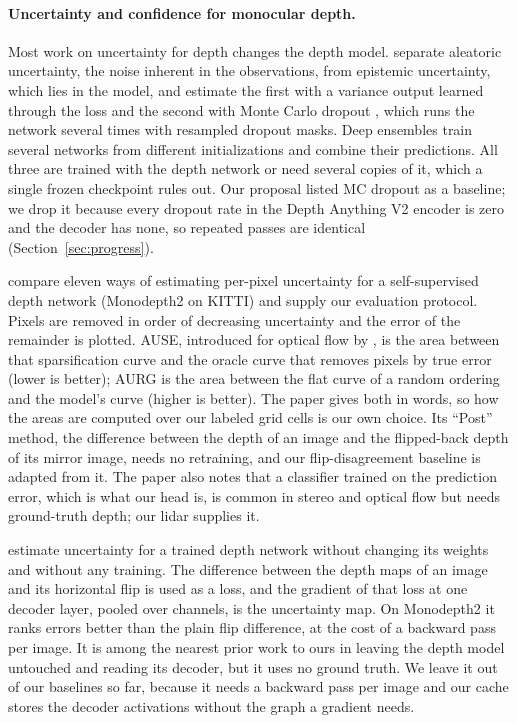 \paragraph{Uncertainty and confidence for monocular depth.}
Most work on uncertainty for depth changes the depth model. \citet{kendall2017uncertainties} separate aleatoric uncertainty, the noise inherent in the observations, from epistemic uncertainty, which lies in the model, and estimate the first with a variance output learned through the loss and the second with Monte Carlo dropout \citep{gal2016dropout}, which runs the network several times with resampled dropout masks. Deep ensembles \citep{lakshminarayanan2017ensembles} train several networks from different initializations and combine their predictions. All three are trained with the depth network or need several copies of it, which a single frozen checkpoint rules out. Our proposal listed MC dropout as a baseline; we drop it because every dropout rate in the Depth Anything V2 encoder is zero and the decoder has none, so repeated passes are identical (Section~\ref{sec:progress}).

\citet{poggi2020uncertainty} compare eleven ways of estimating per-pixel uncertainty for a self-supervised depth network (Monodepth2 on KITTI) and supply our evaluation protocol. Pixels are removed in order of decreasing uncertainty and the error of the remainder is plotted. AUSE, introduced for optical flow by \citet{ilg2018uncertainty}, is the area between that sparsification curve and the oracle curve that removes pixels by true error (lower is better); AURG is the area between the flat curve of a random ordering and the model's curve (higher is better). The paper gives both in words, so how the areas are computed over our labeled grid cells is our own choice. Its ``Post'' method, the difference between the depth of an image and the flipped-back depth of its mirror image, needs no retraining, and our flip-disagreement baseline is adapted from it. The paper also notes that a classifier trained on the prediction error, which is what our head is, is common in stereo and optical flow but needs ground-truth depth; our lidar supplies it.

\citet{hornauer2022gradient} estimate uncertainty for a trained depth network without changing its weights and without any training. The difference between the depth maps of an image and its horizontal flip is used as a loss, and the gradient of that loss at one decoder layer, pooled over channels, is the uncertainty map. On Monodepth2 it ranks errors better than the plain flip difference, at the cost of a backward pass per image. It is among the nearest prior work to ours in leaving the depth model untouched and reading its decoder, but it uses no ground truth. We leave it out of our baselines so far, because it needs a backward pass per image and our cache stores the decoder activations without the graph a gradient needs.

